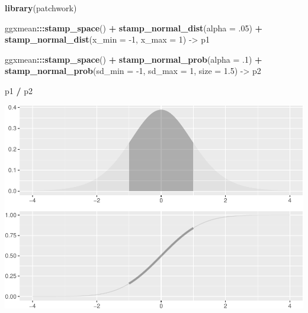 \documentclass[12pt]{article}
\newenvironment{Shaded}{\begin{snugshade}}{\end{snugshade}}
\newcommand{\DataTypeTok}[1]{\textcolor[rgb]{0.13,0.29,0.53}{#1}}
\newcommand{\DecValTok}[1]{\textcolor[rgb]{0.00,0.00,0.81}{#1}}
\newcommand{\FloatTok}[1]{\textcolor[rgb]{0.00,0.00,0.81}{#1}}
\newcommand{\KeywordTok}[1]{\textcolor[rgb]{0.13,0.29,0.53}{\textbf{#1}}}
\newcommand{\NormalTok}[1]{#1}
\newcommand{\OperatorTok}[1]{\textcolor[rgb]{0.81,0.36,0.00}{\textbf{#1}}}
\newcommand{\StringTok}[1]{\textcolor[rgb]{0.31,0.60,0.02}{#1}}
\begin{document}
\begin{Shaded}
\begin{Highlighting}[]
\KeywordTok{library}\NormalTok{(patchwork)}

\NormalTok{ggxmean}\OperatorTok{:::}\KeywordTok{stamp_space}\NormalTok{() }\OperatorTok{+}
\StringTok{  }\KeywordTok{stamp_normal_dist}\NormalTok{(}\DataTypeTok{alpha =} \FloatTok{.05}\NormalTok{) }\OperatorTok{+}
\StringTok{  }\KeywordTok{stamp_normal_dist}\NormalTok{(}\DataTypeTok{x_min =} \DecValTok{-1}\NormalTok{, }\DataTypeTok{x_max =} \DecValTok{1}\NormalTok{) ->}
\NormalTok{p1}
    
\NormalTok{  ggxmean}\OperatorTok{:::}\KeywordTok{stamp_space}\NormalTok{() }\OperatorTok{+}
\StringTok{  }\KeywordTok{stamp_normal_prob}\NormalTok{(}\DataTypeTok{alpha =} \FloatTok{.1}\NormalTok{) }\OperatorTok{+}
\StringTok{  }\KeywordTok{stamp_normal_prob}\NormalTok{(}\DataTypeTok{sd_min =} \DecValTok{-1}\NormalTok{, }\DataTypeTok{sd_max =} \DecValTok{1}\NormalTok{, }
                             \DataTypeTok{size =} \FloatTok{1.5}\NormalTok{) ->}
\NormalTok{p2}
  
\NormalTok{p1 }\OperatorTok{/}\StringTok{ }\NormalTok{p2}
\end{Highlighting}
\end{Shaded}

\begin{center}\includegraphics[width=0.5\linewidth]{manuscript_files/figure-latex/unnamed-chunk-13-1} \end{center}
\end{document}
